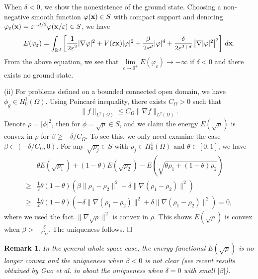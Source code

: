 \documentclass{elsarticle}
\newcommand{\vep}{\varepsilon}
\newcommand{\be}{\begin{equation}}
\newcommand{\ee}{\end{equation}}
\newtheorem{remark}{Remark}[section]
\newcommand{\bx}{{\bf x} }
\begin{document}
When $\delta<0$, we show the nonexistence of the ground state.
Choosing a non-negative smooth function $\varphi(\bx) \in S$ with compact support  and denoting $\varphi_\vep(\bx)=\vep^{-d/2}\varphi(\bx/\vep) \in S$, we have
\be
E(\varphi_\vep)=\int_{\Bbb R^d}\left[\frac{1}{2\vep^2}|\nabla\varphi|^2+ V(\vep\bx)|\varphi|^2+\frac{\beta}{2\vep^d}|\varphi|^4+\frac{\delta}{2\vep^{2+d}}\left|\nabla|\varphi|^2\right|^2\right]\,d\bx.
\ee
From the above equation, we see that $\lim\limits_{\vep\to 0^+}E(\varphi_\vep)\to-\infty$ if $\delta<0$ and there exists no ground state.

(ii) For problems defined on a bounded connected open domain,
we have $\phi_g\in H_0^1(\Omega)$. Using Poincar\'{e} inequality, %
there exists $C_{\Omega}>0$ such that
\be\label{eq:sobo1}
\|f\|_{L^2(\Omega)}\leq C_{\Omega}\|\nabla f\|_{L^2(\Omega)}.
\ee
Denote $\rho=|\phi|^2$, then for $\phi=\sqrt{\rho}\in S$,  and we claim the energy $E(\sqrt{\rho})$ is convex in $\rho$ for $\beta\ge-\delta/C_{\Omega}$. To see this,
we only need examine the case $\beta\in (-\delta/C_{\Omega},0)$. For any $\sqrt{\rho_j}\in S$ with $\rho_j\in H_0^1(\Omega)$ and $\theta\in[0,1]$, we have
\begin{align*}
&\theta E(\sqrt{\rho_1})+(1-\theta)E(\sqrt{\rho_2})-E(\sqrt{\theta\rho_1+(1-\theta)\rho_2})
\\ \ge&\frac12\theta(1-\theta)\left(\beta\|\rho_1-\rho_2\|^2+\delta\|\nabla(\rho_1-\rho_2)\|^2\right)\\
\ge&\frac12\theta(1-\theta)\left(-\delta\|\nabla(\rho_1-\rho_2)\|^2+\delta\|\nabla(\rho_1-\rho_2)\|^2\right)=0,
\end{align*}
where we used the fact $\|\nabla\sqrt{\rho}\|^2$ is convex in $\rho$. This shows $E(\sqrt{\rho})$ is convex   when $
\beta>-\frac{\delta}{C_{\Omega}}$. The uniqueness follows. $\hfill\Box$
\begin{remark}
In the general whole space case,  the energy functional $E(\sqrt{\rho})$ is no longer convex and the uniqueness when $\beta<0$
is not clear (see recent results obtained by Guo et al. in \cite{Guo} about the uniqueness when $\delta=0$ with small $|\beta|$).
\end{remark}
\end{document}

